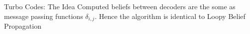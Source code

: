 \documentclass{beamer}
\begin{document}
\begin{darkframes}
\begin{frame}{Turbo Codes: The Idea}
        Computed beliefs between decoders are the some as message passing functions \alert{$\delta_{i,j}$}. Hence the algorithm is identical to \alert{Loopy Belief Propagation}
    \end{frame}

  \end{darkframes}
\end{document}
